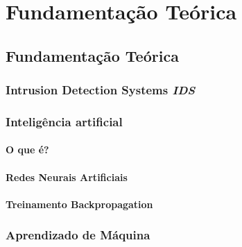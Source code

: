 \part{Fundamentação Teórica}
\chapter[Fundamentação Teórica]{Fundamentação Teórica}

\section{Intrusion Detection Systems \textit{IDS}}
    

\section{Inteligência artificial}
    \subsection{O que é?}
        
    \subsection{Redes Neurais Artificiais}
        
    \subsection{Treinamento Backpropagation}
        

\section{Aprendizado de Máquina}
    